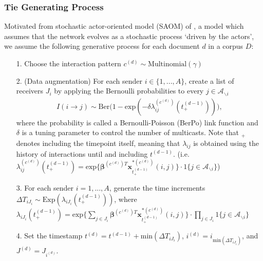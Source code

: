 \documentclass[a4paper]{article}
\begin{document}
\subsubsection{Tie Generating Process}\label{subsubsec: Tie Generating Process}
Motivated from stochastic actor-oriented model (SAOM) of \cite{snijders2017stochastic}, a model which assumes that the network evolves as a stochastic process `driven by the actors’, we assume the following generative process for each document $d$ in a corpus $D$:
\begin{itemize}
	\item[1.] Choose the interaction pattern $c^{(d)} \sim \mbox{Multinomial}(\gamma)$
	\item[2.] (Data augmentation) For each sender $i \in \{1,...,A\}$, create a list of receivers $J_i$ by applying the Bernoulli probabilities to every $j \in \mathcal{A}_{\backslash i}$
	\begin{align*} I(i \rightarrow j) \sim \mbox{Ber}\Big(1-\mbox{exp}(-\delta\lambda^{(c^{(d)})}_{ij}(t_+^{(d-1)}))\Big),
	\end{align*}
	where the probability is called a Bernoulli-Poisson (BerPo) link function \citep{zhou2015infinite} and $\delta$ is a tuning parameter to control the number of multicasts. Note that $_+$ denotes including the timepoint itself, meaning that $\lambda_{ij}$ is obtained using the history of interactions until and including $t^{(d-1)}$. (i.e. $\lambda^{(c^{(d)})}_{ij}(t_+^{(d-1)})=\mbox{exp}\Big\{\boldsymbol{\beta}^{(c^{(d)})T}\boldsymbol{x}^{*(c^{(d)})}_{t^{(d-1)}_+}(i, j)\Big\}\cdot 1\{j \in \mathcal{A}_{\backslash i}\}$)
	\item[3.] For each sender $i = 1,...,A$, generate the time increments $\Delta T_{i{J_i}} \sim \mbox{Exp}(\lambda_{i{J_i}}(t_+^{(d-1)}))$, where $\lambda_{i{J_i}}(t_+^{(d-1)})= \mbox{exp}\Big\{\sum\limits_{j \in{J_i}}\boldsymbol{\beta}^{(c^{(d)})T}\boldsymbol{x}^{*(c^{(d)})}_{t^{(d-1)}_+}(i, j)\Big\}\cdot \prod\limits_{j \in J_i}1\{j \in \mathcal{A}_{\backslash i}\}$
	 \item[4.] Set the timestamp $t^{(d)} = t^{(d-1)}+\mbox{min}(\Delta T_{i{J_i}})$, $i^{(d)} = i_{\mbox{min}(\Delta T_{i{J_i}})}$, and $J^{(d)} = J_{i^{(d)}}$.
\end{itemize}
\end{document}
